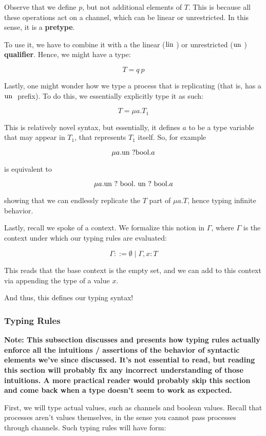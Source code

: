 Observe that we define $p$, but not additional elements of $T$. This is because all these operations act on a channel, which can be linear  or unrestricted. In this sense, it is a \textbf{pretype}.

To use it, we have to combine it with a the linear ($\text{lin }$) or unrestricted ($\text{un }$) \textbf{qualifier}. Hence, we might have a type:

$$
T = q\ p
$$


Lastly, one might wonder how we type a process that is replicating (that is, has a $\text{un }$ prefix). To do this, we essentially explicitly type it as such:

$$
T = \mu a.T_1
$$

This is relatively novel syntax, but essentially, it defines $a$ to be a type variable that may appear in $T_1$, that represents $T_1$ itself. So, for example

$$
\mu a. \text{un } ?\text{bool} . a
$$

is equivalent to

$$
\mu a . \text{un } ?\ \text{bool} .\ \text{un } ?\ \text{bool} . a
$$

showing that we can endlessly replicate the $T$ part of $\mu a . T$, hence typing infinite behavior.

Lastly, recall we spoke of a context. We formalize this notion in $\Gamma$, where $\Gamma$ is the context under which our typing rules are evaluated:

$$
\Gamma ::= \emptyset \mid \Gamma, x : T
$$

This reads that the base context is the empty set, and we can add to this context via appending the type of a value $x$.

And thus, this defines our typing syntax!

\subsubsection{Typing Rules}

\textbf{Note: This subsection discusses and presents how typing rules actually enforce all the intuitions / assertions of the behavior of syntactic elements we've since discussed. It's not essential to read, but reading this section will probably fix any incorrect understanding of those intuitions. A more practical reader would probably skip this section and come back when a type doesn't seem to work as expected.}

First, we will type actual values, such as channels and boolean values. Recall that processes aren't values themselves, in the sense you cannot pass processes through channels. Such typing rules will have form:

